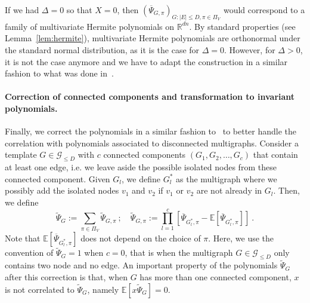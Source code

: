 \documentclass{article}
\begin{document}
If we had $\Delta = 0$ so that $X=0$, then $(\overline{\Psi}_{G,\pi})_{G: |E| \leq D,\pi \in \Pi_V}$ would correspond to a family of multivariate Hermite polynomials on $\mathbb{R}^{dn}$. By standard properties (see Lemma~\ref{lem:hermite}), multivariate Hermite polynomials are orthonormal under the standard normal distribution, as it is the case for $\Delta=0$. However, for $\Delta>0$, it is not the case anymore and we have to adapt the construction in a similar fashion to what was done in~\cite{CGGV25}.





\paragraph{Correction of connected components and transformation to invariant polynomials.} Finally, we correct the polynomials in a similar fashion to~\cite{CGGV25} to better handle the correlation with polynomials associated to disconnected multigraphs. Consider a template $G\in \mathcal{G}_{\leq D}$ with $c$ connected components $(G_1,G_2,\ldots, G_c)$ that contain at least one edge, i.e. we leave aside the possible isolated nodes from these connected component. 
Given $G_l$, we define $G^*_l$ as the multigraph where we possibly add the isolated nodes $v_1$ and $v_2$ if $v_1$ or $v_2$ are not already in $G_l$. 
Then, we define
\begin{equation}\label{eq:definition_psi_tilde} 
\widetilde{\Psi}_{G} := \sum_{\pi\in \Pi_V}\widetilde{\Psi}_{G,\pi} \ ; \quad  \widetilde{\Psi}_{G,\pi}:=\prod_{l=1}^c \left[\overline{\Psi}_{G^*_l,\pi} - \mathbb{E}[\overline{\Psi}_{G^*_l,\pi} ]\right] \ . 
\end{equation}
 Note that $\mathbb{E}[\overline{\Psi}_{G^*_l,\pi} ]$ does not depend on the choice of $\pi$. Here, we use the convention of $\widetilde{\Psi}_G=1$ when $c=0$, that is when the multigraph $G\in \mathcal{G}_{\leq D}$ only contains two node and no edge.  An important property of the polynomials $\widetilde{\Psi}_{G}$ after this correction is that, when $G$ has more than one connected component, $x$ is not correlated to $\widetilde{\Psi}_{G}$, namely $\mathbb E[x\widetilde{\Psi}_{G}]=0$. 
 
\end{document}
